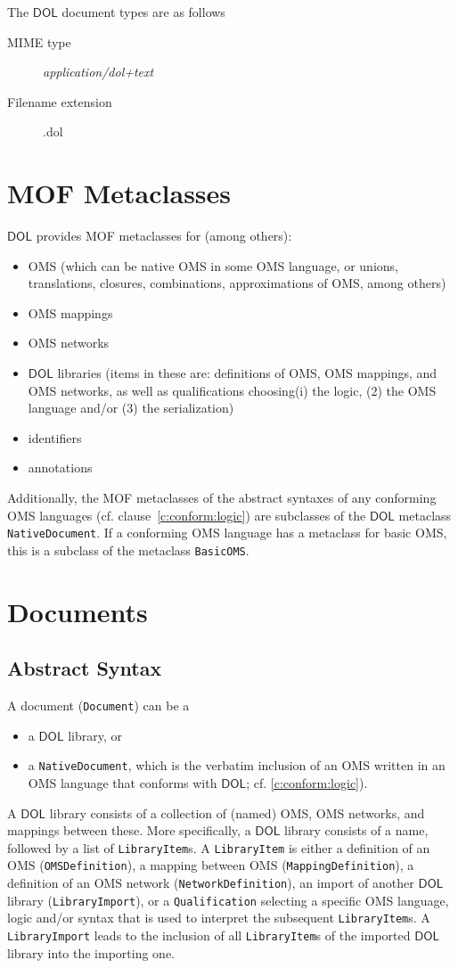 \documentclass[10pt,fleqn,final]{scrreprt}
\makeatletter
\newcommand{\cbs}[0]{\color{red}\xspace} %
\newcommand{\cbe}[0]{\color{black}\xspace} %
\newcommand{\red}[1]{#1} %
\newcommand*{\cf}{cf.\@\xspace}
\newcommand*{\termref}[1]{\index{#1}#1\xspace}
\newcommand*{\mimetype}[1]{\textit{#1}}
\newcommand*{\syntax}[1]{\texttt{#1}}
\newcommand*{\DOL}{\ensuremath{\mathsf{DOL}}\xspace}
\newcommand{\clauserefname}{clause}
\newcommand{\cref}[1]{\clauserefname~\ref{#1}}
\newcommand{\sclause}[1]{\section{#1}}
\newcommand{\ssclause}[1]{\subsection{#1}}
\newenvironment{definitions}[0]{\medskip }{}
\makeatother
\begin{document}
\begin{definitions}
\medskip
The \DOL document types are as follows
		\begin{description}
			\item[MIME type] \mimetype{application/dol+text}
			\item[Filename extension] .dol
		\end{description}


\sclause{MOF Metaclasses}

\DOL provides\cbs MOF metaclasses for (among others):\cbe   
\begin{itemize}
\item OMS (which can be native OMS in some OMS language, or unions, translations, \cbs closures\cbe, combinations, approximations of OMS, among others)
\item OMS mappings 
\item OMS networks
\item \DOL libraries (items in these are: definitions of OMS, OMS mappings, and OMS networks, as well as qualifications choosing\cbs (i) the logic,
(2) the OMS language and/or (3) the serialization)\cbe
\item identifiers
\item annotations
\end{itemize}
 
Additionally, the \cbs MOF metaclasses \cbe of the abstract syntaxes
of any conforming OMS languages (\cf \cref{c:conform:logic}) \cbs are
subclasses of the \DOL metaclass \syntax{NativeDocument}.
If a conforming OMS language has a metaclass for basic OMS,
this is a subclass of the metaclass \syntax{BasicOMS}.\cbe






\sclause{Documents}\label{c:libraries}
\ssclause{Abstract Syntax}

\cbs
A \termref{document} (\syntax{Document}) can be a 
\begin{itemize}
\item a \DOL library, or
\item a \syntax{NativeDocument}, which is the verbatim inclusion of an
  OMS written in an OMS language that conforms with \DOL; \cf
  \ref{c:conform:logic}).
\end{itemize}
A \DOL library 
\cbe
 consists of a collection of (named)  OMS, \cbs OMS networks,\cbe{} and mappings between these.  More specifically, a \DOL
library consists of a name, followed by a list of
\syntax{LibraryItem}s.  A \syntax{LibraryItem} is either a
definition of an OMS  (\syntax{OMSDefinition}), 
a mapping between OMS
(\syntax{MappingDefinition}), 
a definition of an OMS network  (\syntax{NetworkDefinition}),
an import of another \DOL library (\syntax{LibraryImport}),
or a \syntax{Qualification} selecting a specific
OMS language, logic and/or syntax that is used to interpret the
subsequent \syntax{LibraryItem}s.  
\cbs A \syntax{LibraryImport} leads to the inclusion of all \syntax{LibraryItem}s of the imported \DOL library into the importing one.\cbe




\end{definitions}
\end{document}
